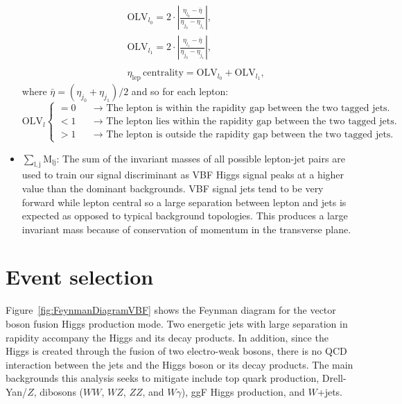 \begin{itemize}
\begin{eqnarray}
&& \textrm{OLV}_{l_0} = 2 \cdot |\frac{\eta_{l_0}-\bar{\eta}}{\eta_{j_0}-\eta_{j_1}}|,  \nonumber\\
&& \textrm{OLV}_{l_1} = 2 \cdot |\frac{\eta_{l_1}-\bar{\eta}}{\eta_{j_0}-\eta_{j_1}}|,  \nonumber\\
&&\nonumber \\
&& \eta_{\mathrm{lep}} \, \textrm{centrality} = \textrm{OLV}_{l_0} + \textrm{OLV}_{l_1},
\label{eqn:contOLV_def}
\end{eqnarray}
where $\bar{\eta} = (\eta_{j_0} + \eta_{j_1})/2$ and so for each lepton: 
 \begin{equation}
   \textrm{OLV}_l \left\{
   \begin{array} {ll}
     = 0 & \quad \rightarrow \textrm{  The lepton is within the rapidity gap between the two tagged jets.} \\
     < 1 & \quad \rightarrow \textrm{  The lepton lies within the rapidity gap between the two tagged jets.} \\
     >1  & \quad \rightarrow \textrm{   The lepton is outside the rapidity gap between the two tagged jets.} 
    \end{array} \right. 
 \end{equation}
\item $\mathrm{\sum_{l,j} M_{lj}}$: The sum of the invariant masses of all possible lepton-jet pairs are used to train our signal discriminant as VBF Higgs signal peaks at a higher value than the dominant backgrounds. VBF signal jets tend to be very forward while lepton central so a large separation between lepton and jets is expected as opposed to typical background topologies. This produces a large invariant mass because of conservation of momentum in the transverse plane.  
\end{itemize}


\section{Event selection}
Figure~\ref{fig:FeynmanDiagramVBF} shows the Feynman diagram for the vector boson fusion Higgs production mode. Two energetic jets with large separation in rapidity accompany the Higgs and its decay products. In addition, since the Higgs is created through the fusion of two electro-weak bosons, there is no QCD interaction between the jets and the Higgs boson or its decay products. The main backgrounds this analysis seeks to mitigate include top quark production, Drell-Yan/$Z$, dibosons ($WW$, $WZ$, $ZZ$, and $W\gamma$), ggF Higgs production, and $W$+jets. 

